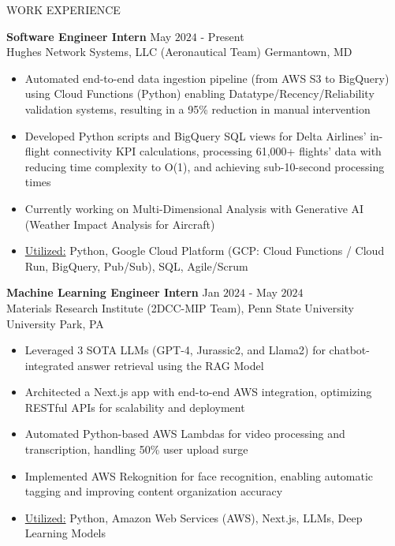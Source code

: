 \documentclass{resume} %
\begin{document}
\begin{rSection}{WORK EXPERIENCE}

{\bf Software Engineer Intern} \hfill May $2024$ - Present\\
Hughes Network Systems, LLC (Aeronautical Team) \hfill Germantown, MD
\begin{itemize}[itemsep = -4pt]
    \item Automated end-to-end data ingestion pipeline (from AWS S3 to BigQuery) using Cloud Functions (Python) enabling Datatype/Recency/Reliability validation systems, resulting in a 95\% reduction in manual intervention
    \item Developed Python scripts and BigQuery SQL views for Delta Airlines' in-flight connectivity KPI calculations, processing 61,000+ flights' data with reducing time complexity to O(1), and achieving sub-10-second processing times
    \item Currently working on Multi-Dimensional Analysis with Generative AI (Weather Impact Analysis for Aircraft)
    \item \underline{Utilized:} Python, Google Cloud Platform (GCP: Cloud Functions / Cloud Run, BigQuery, Pub/Sub), SQL, Agile/Scrum
\end{itemize}

{\bf Machine Learning Engineer Intern} \hfill Jan $2024$ - May $2024$\\
Materials Research Institute (2DCC-MIP Team), Penn State University \hfill University Park, PA
\begin{itemize}[itemsep = -4pt]
    \item Leveraged 3 SOTA LLMs (GPT-4, Jurassic2, and Llama2) for chatbot-integrated answer retrieval using the RAG Model
    \item Architected a Next.js app with end-to-end AWS integration, optimizing RESTful APIs for scalability and deployment
    \item Automated Python-based AWS Lambdas for video processing and transcription, handling 50\% user upload surge
    \item Implemented AWS Rekognition for face recognition, enabling automatic tagging and improving content organization accuracy
    \item \underline{Utilized:} Python, Amazon Web Services (AWS), Next.js, LLMs, Deep Learning Models 
\end{itemize}


\end{rSection}
\end{document}
